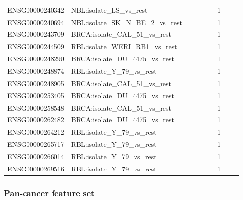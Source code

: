 \begin{landscape}
{\begin{longtable}{p{0.18\linewidth}p{0.65\linewidth}p{0.12\linewidth}}
ENSG00000240342 & NBL:isolate\_\allowbreak{}LS\_\allowbreak{}vs\_\allowbreak{}rest & 1 \\
ENSG00000240694 & NBL:isolate\_\allowbreak{}SK\_\allowbreak{}N\_\allowbreak{}BE\_\allowbreak{}2\_\allowbreak{}vs\_\allowbreak{}rest & 1 \\
ENSG00000243709 & BRCA:isolate\_\allowbreak{}CAL\_\allowbreak{}51\_\allowbreak{}vs\_\allowbreak{}rest & 1 \\
ENSG00000244509 & RBL:isolate\_\allowbreak{}WERI\_\allowbreak{}RB1\_\allowbreak{}vs\_\allowbreak{}rest & 1 \\
ENSG00000248290 & BRCA:isolate\_\allowbreak{}DU\_\allowbreak{}4475\_\allowbreak{}vs\_\allowbreak{}rest & 1 \\
ENSG00000248874 & RBL:isolate\_\allowbreak{}Y\_\allowbreak{}79\_\allowbreak{}vs\_\allowbreak{}rest & 1 \\
ENSG00000248905 & BRCA:isolate\_\allowbreak{}CAL\_\allowbreak{}51\_\allowbreak{}vs\_\allowbreak{}rest & 1 \\
ENSG00000253405 & BRCA:isolate\_\allowbreak{}DU\_\allowbreak{}4475\_\allowbreak{}vs\_\allowbreak{}rest & 1 \\
ENSG00000258548 & BRCA:isolate\_\allowbreak{}CAL\_\allowbreak{}51\_\allowbreak{}vs\_\allowbreak{}rest & 1 \\
ENSG00000262482 & BRCA:isolate\_\allowbreak{}DU\_\allowbreak{}4475\_\allowbreak{}vs\_\allowbreak{}rest & 1 \\
ENSG00000264212 & RBL:isolate\_\allowbreak{}Y\_\allowbreak{}79\_\allowbreak{}vs\_\allowbreak{}rest & 1 \\
ENSG00000265717 & RBL:isolate\_\allowbreak{}Y\_\allowbreak{}79\_\allowbreak{}vs\_\allowbreak{}rest & 1 \\
ENSG00000266014 & RBL:isolate\_\allowbreak{}Y\_\allowbreak{}79\_\allowbreak{}vs\_\allowbreak{}rest & 1 \\
ENSG00000269516 & RBL:isolate\_\allowbreak{}Y\_\allowbreak{}79\_\allowbreak{}vs\_\allowbreak{}rest & 1 \\
\end{longtable}
}
\end{landscape}

\subsubsection{Pan-cancer feature set}

